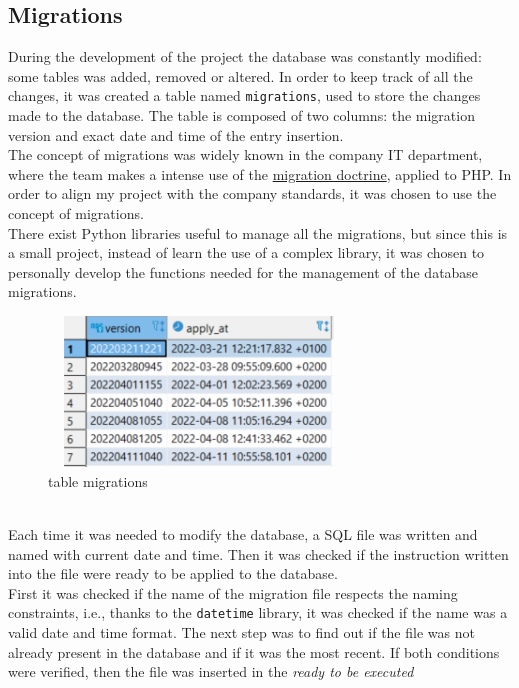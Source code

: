 \documentclass[12pt, a4paper, oneside]{article}
\begin{document}
\subsection{Migrations}
\label{subsec:migrations}
During the development of the project the database was constantly modified: some tables was added, removed or altered. In order to keep track of all the changes, it was created a table named \texttt{migrations},
used to store the changes made to the database. The table is composed of two columns: the migration version and exact date and time of the entry insertion.\\
The concept of migrations was widely known in the company IT department, where the team makes a intense use of the \href{https://www.doctrine-project.org/projects/doctrine-migrations/en/3.3/index.html}{migration doctrine}, 
applied to PHP. In order to align my project with the company standards, it was chosen to use the concept of migrations. \\
There exist Python libraries useful to manage all the migrations, but since this is a small project, instead of learn the use of a complex library, it was chosen to personally develop the functions needed for the management 
of the database migrations.
\begin{figure}[h]
    \centering
    \includegraphics[width=8cm, height=4cm]{table-migrations.png}
    \caption{table migrations}
\end{figure}\\
Each time it was needed to modify the database, a SQL file was written and named with current date and time. Then it was checked if the instruction written into the file were ready to be applied to the 
database.\\
First it was checked if the name of the migration file respects the naming constraints, i.e., thanks to the \texttt{datetime} library, it was checked if the name was a valid date and time format.
The next step was to find out if the file was not already present in the database and if it was the most recent. If both conditions were verified, then the file was inserted in the \emph{ready to be executed}
\end{document}
